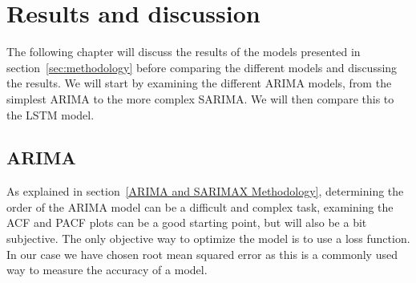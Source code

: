 \section{Results and discussion}\label{sec:results}
The following chapter will discuss the results of the models presented in section~\ref{sec:methodology} before comparing the different models and discussing the results. We will start by examining the different ARIMA models, from the simplest ARIMA to the more complex SARIMA. We will then compare this to the LSTM model. 

\subsection{ARIMA}\label{sec:arima}
As explained in section~\ref{ARIMA and SARIMAX Methodology}, determining the order of the ARIMA model can be a difficult and complex task, examining the ACF and PACF plots can be a good starting point, but will also be a bit subjective. The only objective way to optimize the model is to use a loss function. In our case we have chosen root mean squared error as this is a commonly used way to measure the accuracy of a model.

